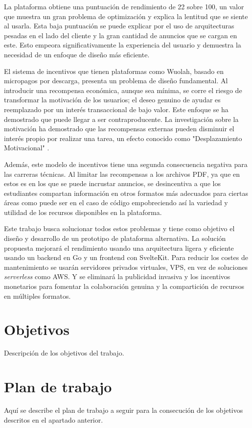 La plataforma obtiene una puntuación de rendimiento de 22 sobre 100, un valor que muestra un gran problema de optimización y explica la lentitud que se siente al usarla. Esta baja puntuación se puede explicar por el uso de arquitecturas pesadas en el lado del cliente y la gran cantidad de anuncios que se cargan en este. Esto empeora significativamente la experiencia del usuario y demuestra la necesidad de un enfoque de diseño más eficiente.

El sistema de incentivos que tienen plataformas como Wuolah, basado en micropagos por descarga, presenta un problema de diseño fundamental. Al introducir una recompensa económica, aunque sea mínima, se corre el riesgo de transformar la motivación de los usuarios; el deseo genuino de ayudar es reemplazado por un interés transaccional de bajo valor. Este enfoque se ha demostrado que puede llegar a ser contraproducente. La investigación sobre la motivación ha demostrado que las recompensas externas pueden disminuir el interés propio por realizar una tarea, un efecto conocido como "Desplazamiento Motivacional" \citep{Deci1999, Frey2001}.

Además, este modelo de incentivos tiene una segunda consecuencia negativa para las carreras técnicas. Al limitar las recompensas a los archivos PDF, ya que en estos es en los que se puede incrustar anuncios, se desincentiva a que los estudiantes compartan información en otros formatos más adecuados para ciertas áreas como puede ser en el caso de código empobreciendo así la variedad y utilidad de los recursos disponibles en la plataforma.

Este trabajo busca solucionar todos estos problemas y tiene como objetivo el diseño y desarrollo de un prototipo de plataforma alternativa. La solución propuesta mejorará el rendimiento usando una arquitectura ligera y eficiente usando un backend en Go y un frontend con SvelteKit. Para reducir los costes de mantenimiento se usarán servidores privados virtuales, VPS, en vez de soluciones \textit{serverless} como AWS. Y se eliminará la publicidad invasiva y los incentivos monetarios para fomentar la colaboración genuina y la compartición de recursos en múltiples formatos.

\section{Objetivos}
Descripción de los objetivos del trabajo.


\section{Plan de trabajo}
Aquí se describe el plan de trabajo a seguir para la consecución de los objetivos descritos en el apartado anterior.



